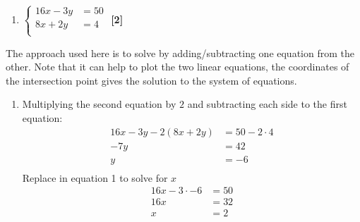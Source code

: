 \documentclass[a4paper, leqno, 12pt]{article}
\newenvironment{top_enumerate}{
\begin{enumerate}
  \setlength{\itemsep}{2em}
  \setlength{\topsep}{-0pt}
  \setlength{\partopsep}{-0pt}
}{\end{enumerate}}
\begin{document}
\begin{top_enumerate}
\setcounter{equation}{0}  %
\begin{enumerate}
	\setlength{\topsep}{-0pt}
	\setlength{\partopsep}{-0pt}
	\setlength{\itemsep}{10pt}
			\item $\left\{\begin{aligned}
	{16}x - {3}y & = {50}\\
	{8}x + {2}y & = {4}\\
	\end{aligned}\right.$
	 \quad \textbf{[2]}
\end{enumerate}\addtocounter{enumi}{-1}
\item The approach used here is to solve by adding/subtracting one equation from the other. Note that it can help to plot the two linear equations, the coordinates of the intersection point gives the solution to the system of equations.
 
\setcounter{equation}{0}  %
\begin{enumerate}
	\setlength{\topsep}{-0pt}
	\setlength{\partopsep}{-0pt}
	\setlength{\itemsep}{10pt}
			\item Multiplying the second equation by ${2}$ and subtracting each side to the first equation:
	\[
	\begin{aligned}
	{16}x - {3}y - {2}({8}x + {2}y) & = {50} - {2}\cdot{4}\\
	{-7}y & = {42}\\
	y & = {-6}\\
	\end{aligned}
	\]
	Replace in equation 1 to solve for $x$
	\[
	\begin{aligned}
	{16}x-{3}\cdot{-6} & = {50}\\
	{16}x & = {32}\\
	x & = {2}\\
	\end{aligned}
	\]
	
	\begin{center}
	\end{center}
	 \quad \textbf{}
\end{enumerate}\newpage


\end{top_enumerate}
\end{document}

